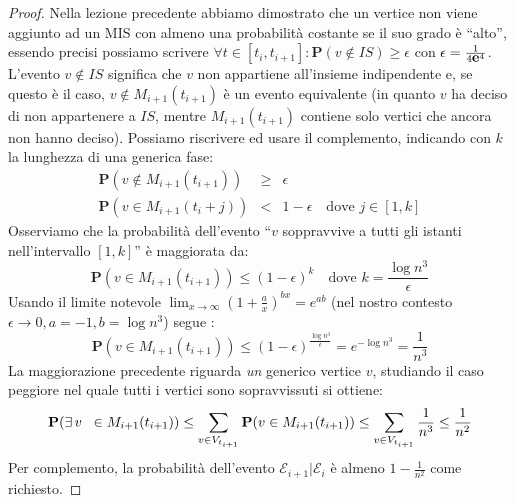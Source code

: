 \documentclass{article}
\begin{document}
\begin{proof}
    Nella lezione precedente abbiamo dimostrato che
    un vertice non viene aggiunto ad un MIS con almeno una probabilit\`a 
    costante se il suo grado \`e ``alto'', essendo precisi possiamo scrivere 
    $\forall t \in [t_i,t_{i+1}]: \mathbf{P}(v \not \in IS) \geq \epsilon$
    con $\epsilon ={{1} \over {4\mbox{{\bfseries e}}^{4}}}$.
    L'evento $v \not \in IS$ significa che $v$ non appartiene all'insieme
    indipendente e, se questo \`e il caso, $v \not \in M_{i+1}(t_{i+1})$ 
    \`e un evento equivalente (in quanto $v$ ha deciso 
    di non appartenere a $IS$, mentre $M_{i+1}(t_{i+1})$ contiene solo
    vertici che ancora non hanno deciso). Possiamo
    riscrivere ed usare il complemento, indicando con $k$ la lunghezza
    di una generica fase:
    \begin{displaymath}
    \begin{array} {lcl} 
        \mathbf{P}(v \not \in M_{i+1}(t_{i+1})) & \geq & \epsilon \\
        \mathbf{P}(v \in M_{i+1}(t_i + j)) & < & 1-\epsilon \quad 
            \text{dove } j\in[1,k]
    \end{array}
    \end{displaymath}
    Osserviamo che la probabilit\`a dell'evento ``$v$ soppravvive a tutti
    gli istanti nell'intervallo $[1,k]$'' \`e maggiorata da:
    \begin{displaymath}
        \mathbf{P}(v \in M_{i+1}(t_{i+1})) \leq (1 - \epsilon)^k 
            \quad \text{dove } k = \frac{\log{n}^3}{\epsilon}
    \end{displaymath}
    Usando il limite notevole $\lim_{x \rightarrow \infty}{(1 + 
    \frac{a}{x})^{bx}} = e^{ab}$ (nel nostro contesto $\epsilon \rightarrow 0
    , a = -1, b = \log{n^3}$)
    segue :
    \begin{displaymath}
        \mathbf{P}(v \in M_{i+1}(t_{i+1})) \leq (1 - \epsilon)^
        \frac{\log{n}^3}{\epsilon} = e^{-\log{n}^3} = \frac{1}{n^3}
    \end{displaymath}
    La maggiorazione precedente riguarda \emph{un}
    generico vertice $v$, studiando il caso peggiore nel quale tutti i 
    vertici sono sopravvissuti si ottiene:
    \begin{displaymath}
        \mathbf{P}(\exists\,v\;\; \in M_{i+1}(t_{i+1})) \leq 
        \sum_{v \in V_{t_{i+1}}}{\mathbf{P}(v \in M_{i+1}(t_{i+1}))} \leq
        \sum_{v \in V_{t_{i+1}}}{\frac{1}{n^3}} \leq
        \frac{1}{n^2}
    \end{displaymath}
    Per complemento, la probabilit\`a dell'evento $\mathcal{E}_{i+1}|
    \mathcal{E}_i$ \`e almeno $1 - \frac{1}{n^2}$ come richiesto.
\end{proof}
\end{document}
